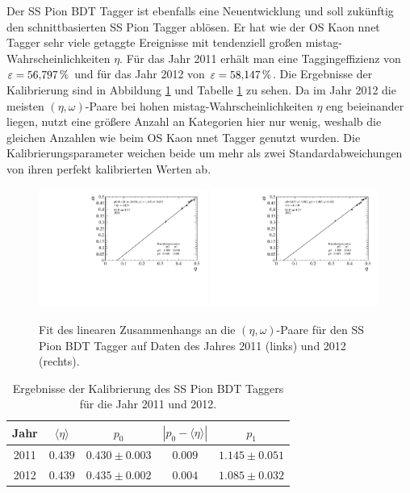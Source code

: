 Der SS Pion BDT Tagger ist ebenfalls eine Neuentwicklung und soll zukünftig den schnittbasierten SS Pion Tagger ablösen. Er hat wie der OS Kaon nnet Tagger sehr viele getaggte Ereignisse mit tendenziell großen mistag-Wahrscheinlichkeiten $\eta$. Für das Jahr \num{2011} erhält man eine Taggingeffizienz von $\varepsilon=\SI{56{,}797}{\%}$ und für das Jahr \num{2012} von $\varepsilon=\SI{58{,}147}{\%}$. Die Ergebnisse der Kalibrierung sind in Abbildung \ref{fig:fit_SSPionBDT} und Tabelle \ref{tab:result_SSPionBDT} zu sehen. Da im Jahr \num{2012} die meisten $(\eta,\omega)$-Paare bei hohen mistag-Wahrscheinlichkeiten $\eta$ eng beieinander liegen, nutzt eine größere Anzahl an Kategorien hier nur wenig, weshalb die gleichen Anzahlen wie beim OS Kaon nnet Tagger genutzt wurden.  Die Kalibrierungsparameter weichen beide um mehr als zwei Standardabweichungen von ihren perfekt kalibrierten Werten ab. 
\begin{figure}[htbp]
	\centering
		\includegraphics[width=0.49\textwidth]{fig/2011_SSPionBDT.pdf}
		\includegraphics[width=0.49\textwidth]{fig/2012_SSPionBDT.pdf}
	\caption{Fit des linearen Zusammenhangs an die $(\eta,\omega)$-Paare für den SS Pion BDT Tagger auf Daten des Jahres \num{2011} (links) und \num{2012} (rechts).}
	\label{fig:fit_SSPionBDT} 
\end{figure}
\begin{table}[htbp]
	\centering
	\caption{Ergebnisse der Kalibrierung des SS Pion BDT Taggers für die Jahr \num{2011} und \num{2012}.}
	\label{tab:result_SSPionBDT}
	\begin{tabular}{ccccc}
	\toprule
       Jahr & $\langle\eta\rangle$ & $p_0$ & $\left|p_0-\langle\eta\rangle\right|$ & $p_1$ \\ 
       \midrule 
	2011 & $0{.}439$ & $0{.}430\pm0{.}003$ & $0{.}009$ & $1{.}145\pm0{.}051$ \\
   	2012 & $0{.}439$ & $0{.}435\pm0{.}002$ & $0{.}004$ & $1{.}085\pm0{.}032$ \\ 
	\bottomrule
  \end{tabular}
\end{table}

